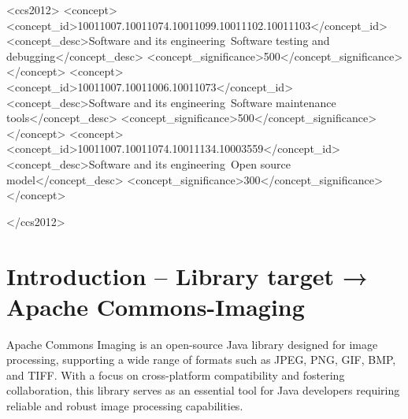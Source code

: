 \documentclass[sigconf]{acmart}
\begin{document}
\begin{CCSXML}
<ccs2012>
   <concept>
       <concept_id>10011007.10011074.10011099.10011102.10011103</concept_id>
       <concept_desc>Software and its engineering~Software testing and debugging</concept_desc>
       <concept_significance>500</concept_significance>
    </concept>
    <concept>
       <concept_id>10011007.10011006.10011073</concept_id>
       <concept_desc>Software and its engineering~Software maintenance tools</concept_desc>
       <concept_significance>500</concept_significance>
   </concept>
   <concept>
       <concept_id>10011007.10011074.10011134.10003559</concept_id>
       <concept_desc>Software and its engineering~Open source model</concept_desc>
       <concept_significance>300</concept_significance>
   </concept>

 </ccs2012>
\end{CCSXML}





\maketitle

\section{Introduction – Library target →  Apache Commons-Imaging}
Apache Commons Imaging \cite{apache-commons-imaging} is an open-source Java library designed for image processing, supporting a wide range of formats such as JPEG, PNG, GIF, BMP, and TIFF. With a focus on cross-platform compatibility and fostering collaboration, this library serves as an essential tool for Java developers requiring reliable and robust image processing capabilities.
\end{document}
